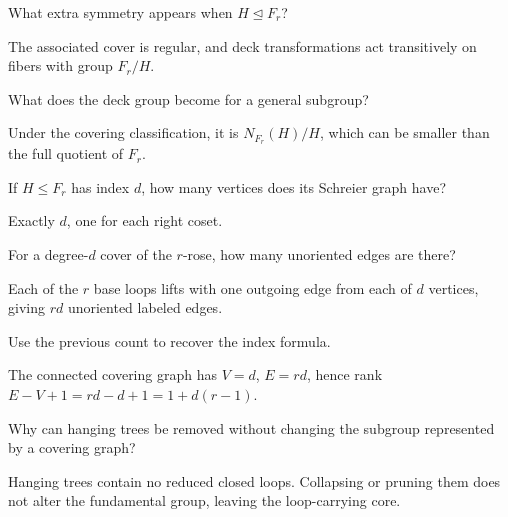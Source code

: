 \begin{problem}\label{prob:viii14-13}
What extra symmetry appears when \(H\trianglelefteq F_r\)?
\end{problem}
\begin{solution}
The associated cover is regular, and deck transformations act transitively on fibers with group \(F_r/H\).
\end{solution}

\begin{problem}\label{prob:viii14-14}
What does the deck group become for a general subgroup?
\end{problem}
\begin{solution}
Under the covering classification, it is \(N_{F_r}(H)/H\), which can be smaller than the full quotient of \(F_r\).
\end{solution}

\begin{problem}\label{prob:viii14-15}
If \(H\le F_r\) has index \(d\), how many vertices does its Schreier graph have?
\end{problem}
\begin{solution}
Exactly \(d\), one for each right coset.
\end{solution}

\begin{problem}\label{prob:viii14-16}
For a degree-\(d\) cover of the \(r\)-rose, how many unoriented edges are there?
\end{problem}
\begin{solution}
Each of the \(r\) base loops lifts with one outgoing edge from each of \(d\) vertices, giving \(rd\) unoriented labeled edges.
\end{solution}

\begin{problem}\label{prob:viii14-17}
Use the previous count to recover the index formula.
\end{problem}
\begin{solution}
The connected covering graph has \(V=d\), \(E=rd\), hence rank \(E-V+1=rd-d+1=1+d(r-1)\).
\end{solution}

\begin{problem}\label{prob:viii14-18}
Why can hanging trees be removed without changing the subgroup represented by a covering graph?
\end{problem}
\begin{solution}
Hanging trees contain no reduced closed loops. Collapsing or pruning them does not alter the fundamental group, leaving the loop-carrying core.
\end{solution}

